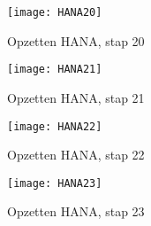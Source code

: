             \begin{figure}	
                \centering
                \texttt{[image: HANA20]}
                \caption{Opzetten HANA, stap 20} \label{HANA20}
            \end{figure}
            
            \begin{figure}	
                \centering
                \texttt{[image: HANA21]}
                \caption{Opzetten HANA, stap 21} \label{HANA21}
            \end{figure}
        
            \begin{figure}	
                \centering
                \texttt{[image: HANA22]}
                \caption{Opzetten HANA, stap 22} \label{HANA22}
            \end{figure}
            
            \begin{figure}	
                \centering
                \texttt{[image: HANA23]}
                \caption{Opzetten HANA, stap 23} \label{HANA23}
            \end{figure}
           
